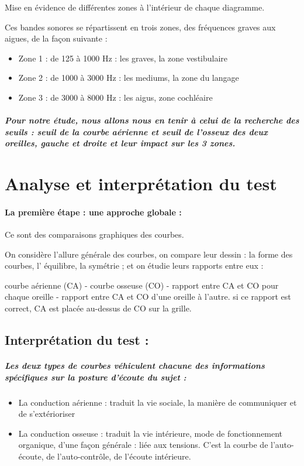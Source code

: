 Mise en évidence de différentes zones à l\textquoteright intérieur
de chaque diagramme. 

Ces bandes sonores se répartissent en trois zones, des fréquences
graves aux aigues, de la façon suivante :
\begin{itemize}
\item Zone 1 : de 125 à 1000 Hz : les graves, la zone vestibulaire
\item Zone 2 : de 1000 à 3000 Hz : les mediums, la zone du langage
\item Zone 3 : de 3000 à 8000 Hz : les aigus, zone cochléaire
\end{itemize}

\subparagraph*{Pour notre étude, nous allons nous en tenir à celui de la recherche
des seuils : seuil de la courbe aérienne et seuil de l'osseux des
deux oreilles, gauche et droite et leur impact sur les 3 zones.}


\section {Analyse et interprétation du test}
\paragraph{La première étape : une approche globale : }

Ce sont des comparaisons graphiques des courbes. 

On considère l'allure générale des courbes, on compare leur dessin
: la forme des courbes, l' équilibre, la symétrie ; et on étudie leurs
rapports entre eux : 

courbe aérienne (CA) - courbe osseuse (CO) - rapport entre CA et CO
pour chaque oreille - rapport entre CA et CO d\textquoteright une
oreille à l'autre. si ce rapport est correct, CA est placée au-dessus
de CO sur la grille.
\subsection{Interprétation du test : }


\subparagraph{Les deux types de courbes véhiculent chacune des informations spécifiques
sur la posture d'écoute du sujet : }
\begin{itemize}
\item La conduction aérienne : traduit la vie sociale, la manière de communiquer
et de s'extérioriser
\item La conduction osseuse : traduit la vie intérieure, mode de fonctionnement
organique, d'une façon générale : liée aux tensions. C'est la courbe
de l\textquoteright auto-écoute, de l\textquoteright auto-contrôle,
de l'écoute intérieure.
\end{itemize}


